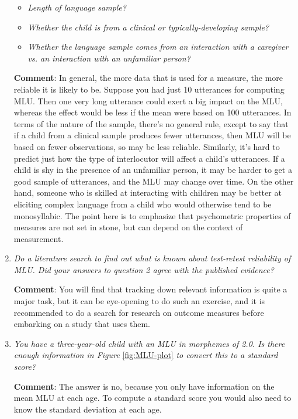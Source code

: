 \documentclass{krantz}
\providecommand{\tightlist}{%
\setlength{\itemsep}{0pt}\setlength{\parskip}{0pt}}
\begin{document}
\begin{enumerate}
\begin{itemize}
\tightlist
\item
\emph{Length of language sample?}
\item
\emph{Whether the child is from a clinical or typically-developing sample?}
\item
\emph{Whether the language sample comes from an interaction with a caregiver vs. an interaction with an unfamiliar person?}
\end{itemize}
\textbf{Comment}: In general, the more data that is used for a measure, the more reliable it is likely to be. Suppose you had just 10 utterances for computing MLU. Then one very long utterance could exert a big impact on the MLU, whereas the effect would be less if the mean were based on 100 utterances. In terms of the nature of the sample, there's no general rule, except to say that if a child from a clinical sample produces fewer utterances, then MLU will be based on fewer observations, so may be less reliable. Similarly, it's hard to predict just how the type of interlocutor will affect a child's utterances. If a child is shy in the presence of an unfamiliar person, it may be harder to get a good sample of utterances, and the MLU may change over time. On the other hand, someone who is skilled at interacting with children may be better at eliciting complex language from a child who would otherwise tend to be monosyllabic. The point here is to emphasize that psychometric properties of measures are not set in stone, but can depend on the context of measurement.


\def\labelenumi{\arabic{enumi}.}
\setcounter{enumi}{2}
\item
  \emph{Do a literature search to find out what is known about test-retest reliability of MLU. Did your answers to question 2 agree with the published evidence?}

  \textbf{Comment}: You will find that tracking down relevant information is quite a major task, but it can be eye-opening to do such an exercise, and it is recommended to do a search for research on outcome measures before embarking on a study that uses them.
\item
  \emph{You have a three-year-old child with an MLU in morphemes of 2.0. Is there enough information in Figure} \ref{fig:MLU-plot} \emph{to convert this to a standard score?}

  \textbf{Comment}: The answer is no, because you only have information on the mean MLU at each age. To compute a standard score you would also need to know the standard deviation at each age.
\end{enumerate}
\end{document}
